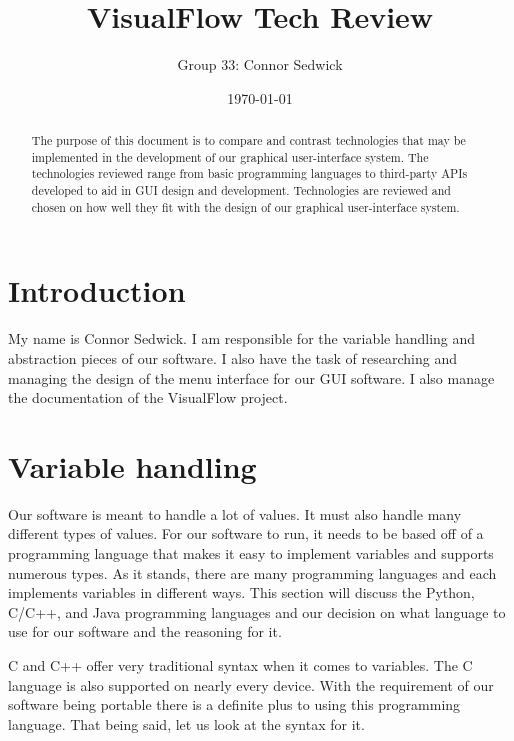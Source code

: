 \documentclass[journal,10pt,onecolumn,compsoc]{IEEEtran} \usepackage[margin=1.0in]{geometry} \usepackage{pdfpages} \usepackage{graphicx}
\title{VisualFlow Tech Review}
\author{Group 33: Connor Sedwick}
\date{\today}
\begin{document}
\maketitle
\begin{abstract}
The purpose of this document is to compare and contrast technologies that may be implemented in the development of our graphical user-interface system. 
The technologies reviewed range from basic programming languages to third-party APIs developed to aid in GUI design and development.
Technologies are reviewed and chosen on how well they fit with the design of our graphical user-interface system.
\end{abstract}
\newpage
\tableofcontents
\newpage
\section{Introduction}
My name is Connor Sedwick. I am responsible for the variable handling and abstraction pieces of our software. 
I also have the task of researching and managing the design of the menu interface for our GUI software.
I also manage the documentation of the VisualFlow project.

\section{Variable handling}
Our software is meant to handle a lot of values. 
It must also handle many different types of values. 
For our software to run, it needs to be based off of a programming language that makes it easy to implement variables and supports numerous types. 
As it stands, there are many programming languages and each implements variables in different ways. 
This section will discuss the Python, C/C++, and Java programming languages and our decision on what language to use for our software and the reasoning for it.

\noindent C and C++ offer very traditional syntax when it comes to variables. 
The C language is also supported on nearly every device. 
With the requirement of our software being portable there is a definite plus to using this programming language. 
That being said, let us look at the syntax for it.
\end{document}
